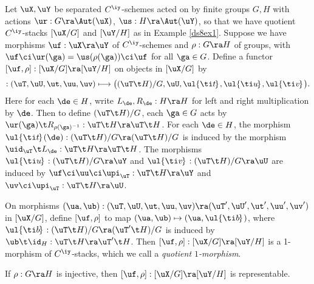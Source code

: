 \documentclass{article}
\begin{document}
\begin{ex} Let $\uX,\uY$ be separated $C^\iy$-schemes acted on by
finite groups $G,H$ with actions $\ur:G\ra\Aut(\uX)$,
$\us:H\ra\Aut(\uY)$, so that we have quotient $C^\iy$-stacks
$[\uX/G]$ and $[\uY/H]$ as in Example \ref{ds8ex1}. Suppose we have
morphisms $\uf:\uX\ra\uY$ of $C^\iy$-schemes and $\rho:G\ra H$ of
groups, with $\uf\ci \ur(\ga)=\us(\rho(\ga))\ci\uf$ for all $\ga\in
G$. Define a functor $[\uf,\rho]:[\uX/G]\ra[\uY/H]$ on objects in
$[\uX/G]$ by
\begin{equation*}
[\uf,\rho]:(\uT,\uU,\ut,\uu,\uv)
\longmapsto \bigl((\uT\t H)/G,\uU,
\ul{\ti t\kern -0.1em}\kern 0.1em,
\ul{\ti u\kern -0.1em}\kern 0.1em,
\ul{\ti v\kern -0.1em}\kern 0.1em\bigr).
\end{equation*}
Here for each $\de\in H$, write $L_\de,R_\de:H\ra H$ for left and
right multiplication by $\de$. Then to define $(\uT\t H)/G$, each
$\ga\in G$ acts by $\ur(\ga)\t R_{\rho(\ga)^{-1}}:\uT\t H\ra\uT\t
H$. For each $\de\in H$, the morphism $\ul{\ti t\kern -0.1em}\kern
0.1em(\de):(\uT\t H)/G\ra (\uT\t H)/G$ is induced by the morphism
$\uid_\uT\t L_\de:\uT\t H\ra\uT\t H$. The morphisms $\ul{\ti u\kern
-0.1em}\kern 0.1em:(\uT\t H)/G\ra\uY$ and $\ul{\ti v\kern
-0.1em}\kern 0.1em:(\uT\t H)/G\ra\uU$ are induced by
$\uf\ci\uu\ci\upi_\uT:\uT\t H\ra\uY$ and~$\uv\ci\upi_\uT:\uT\t
H\ra\uU$.

On morphisms $(\ua,\ub):(\uT,\uU,\ut,\uu,\uv) \ra(\uT',\uU',
\ut',\uu',\uv')$ in $[\uX/G]$, define $[\uf,\rho]$ to map
$(\ua,\ub)\mapsto(\ua,\ul{\ti b\kern -0.1em}\kern 0.1em)$, where
$\ul{\ti b\kern -0.1em}\kern 0.1em:(\uT\t H)/G\ra (\uT'\t H)/G$ is
induced by $\ub\t\id_H:\uT\t H\ra \uT'\t H$. Then $[\uf,\rho]:
[\uX/G]\ra[\uY/H]$ is a 1-morphism of $C^\iy$-stacks, which we call
a {\it quotient\/ $1$-morphism}.

If $\rho:G\ra H$ is injective, then $[\uf,\rho]: [\uX/G]\ra[\uY/H]$
is representable.
\label{ds8ex2}
\end{ex}
\end{document}
